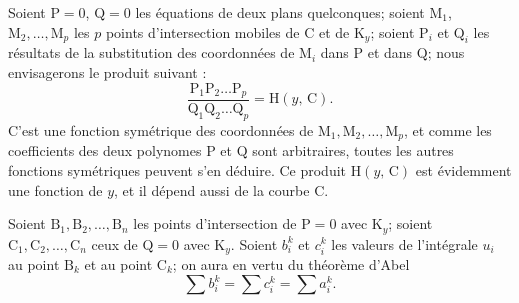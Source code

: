 \documentclass{article}
\begin{document}
Soient $\mathrm{P} = 0$, $\mathrm{Q} = 0$ les équations de deux plans quelconques; soient $\mathrm{M}_{1}$,
$\mathrm{M}_{2}, \ldots, \mathrm{M}_{p}$ les $p$ points d'intersection mobiles de $\mathrm{C}$ et de $\mathrm{K}_{y}$; soient $\mathrm{P}_{i}$ et $\mathrm{Q}_{i}$ les résultats de la substitution des coordonnées de $\mathrm{M}_{i}$ dans $\mathrm{P}$ et dans $\mathrm{Q}$; nous envisagerons le produit suivant :
\[
\frac{\mathrm{P}_{1}\mathrm{P}_{2}\ldots\mathrm{P}_{p}}{\mathrm{Q}_{1}\mathrm{Q}_{2}\ldots\mathrm{Q}_{p}} = \mathrm{H}(y,\, \mathrm{C}).
\]
C'est une fonction symétrique des coordonnées de $\mathrm{M}_{1}, \mathrm{M}_{2}, \ldots, \mathrm{M}_{p}$, et comme les coefficients des deux polynomes $\mathrm{P}$ et $\mathrm{Q}$ sont arbitraires, toutes les autres fonctions symétriques peuvent s'en déduire. Ce produit $\mathrm{H}(y,\, \mathrm{C})$ est évidemment une fonction de $y$, et il dépend aussi de la courbe $\mathrm{C}$.

Soient $\mathrm{B}_{1}, \mathrm{B}_{2}, \ldots, \mathrm{B}_{n}$ les points d'intersection de $\mathrm{P} = 0$ avec $\mathrm{K}_{y}$; soient $\mathrm{C}_{1}, \mathrm{C}_{2}, \ldots, \mathrm{C}_{n}$ ceux de $\mathrm{Q} = 0$ avec $\mathrm{K}_{y}$. Soient $b_{i}^{k}$ et $c_{i}^{k}$ les valeurs de l'intégrale $u_{i}$ au point $\mathrm{B}_{k}$ et au point $\mathrm{C}_{k}$; on aura en vertu du théorème d'Abel
\[
\sum b_{i}^{k} = \sum c_{i}^{k} = \sum a_{i}^{k}. \tag{3}
\]
\end{document}
